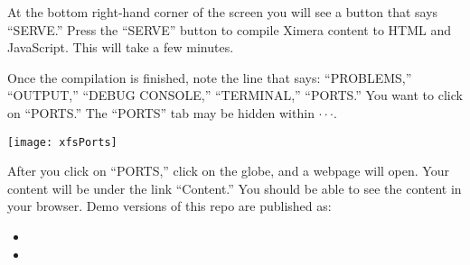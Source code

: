 \documentclass{ximera}
\begin{document}
At the bottom right-hand corner of the screen you will see a button that says
``SERVE.'' Press the ``SERVE'' button to compile Ximera content to HTML and JavaScript.  This will take a few minutes.

\newpage
 Once the compilation is finished, note the line that says:
``PROBLEMS,'' ``OUTPUT,'' ``DEBUG CONSOLE,'' ``TERMINAL,'' ``PORTS.'' You want to click on ``PORTS.'' The ``PORTS'' tab may be hidden within $\cdot \cdot \cdot$.  
\begin{image}
    \texttt{[image: xfsPorts]}
\end{image}
After you click on ``PORTS,'' click on the globe, and a webpage will open. Your content will be under the link ``Content.'' You should be able to see the content in your browser. 
Demo versions of this repo are published as:
\begin{itemize}
\item {}
\item {}
\end{itemize}
\pdfOnly{\twocolumn}
\end{document}

